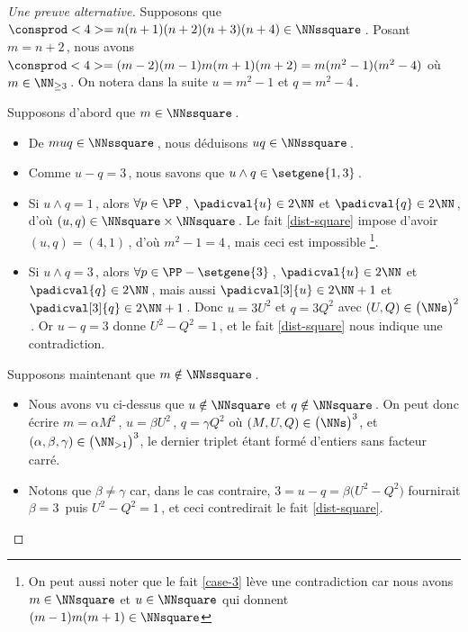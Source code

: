 \begin{proof}[Une preuve alternative]%
	Supposons que $\consprod<4> = n(n+1)(n+2)(n+3)(n+4) \in \NNssquare$\,.
	Posant $m = n+2$\,, nous avons $\consprod<4> = (m-2)(m-1)m(m+1)(m+2) = m(m^2 - 1)(m^2 - 4)$ où $m \in \NN_{\geq 3}$\,.
	On notera dans la suite $u = m^2 - 1$ et $q = m^2 - 4$\,.
	
	\medskip
	
	Supposons d'abord que $m \in \NNssquare$\,.
	\begin{itemize}
		\item De $muq \in \NNssquare$\,, nous déduisons $uq \in \NNssquare$\,.

		\item Comme $u - q = 3$\,, nous savons que $u \wedge q \in \setgene{1, 3}$\,.

		\item Si $u \wedge q = 1$\,, 
		alors $\forall p \in \PP$\,, 
		$\padicval{u} \in 2 \NN$ et $\padicval{q} \in 2 \NN$\,,
		d'où 
		$(u, q) \in \NNsquare \times \NNsquare$\,.
		Le fait \ref{dist-square} impose d'avoir $(u, q) = (4, 1)$\,, d'où $m^2 - 1 = 4$\,, mais ceci est impossible
		\footnote{
			On peut aussi noter que le fait \ref{case-3} lève une contradiction car nous avons $m \in \NNsquare$ et $u \in \NNsquare$ qui donnent $(m-1)m(m+1) \in \NNsquare$
		}.

		\item Si $u \wedge q = 3$\,, 
		alors $\forall p \in \PP - \setgene{3}$\,, 
		$\padicval{u} \in 2 \NN$ et $\padicval{q} \in 2 \NN$\,,
		mais aussi $\padicval[3]{u} \in 2 \NN + 1$ et $\padicval[3]{q} \in 2 \NN + 1$\,.
		Donc 
		$u = 3 U^2$ et $q = 3 Q^2$ avec $(U, Q) \in \big( \NNs \big)^2$\,.
		Or $u - q = 3$ donne $U^2 - Q^2 = 1$\,, et le fait \ref{dist-square} nous indique une contradiction.
	\end{itemize}
	
	\medskip
	
	Supposons maintenant que $m \notin \NNssquare$\,.
	\begin{itemize}
		\item Nous avons vu ci-dessus que $u \notin \NNsquare$ et $q \notin \NNsquare$\,. On peut donc écrire $m = \alpha M^2$\,, $u = \beta U^2$\,, $q = \gamma Q^2$ où $(M, U, Q) \in \big( \NNs \big)^3$, et $(\alpha, \beta, \gamma) \in \big( \NN_{>1} \big)^3$, le dernier triplet étant formé d'entiers sans facteur carré.


		\item Notons que $\beta \neq \gamma$ car, dans le cas contraire, $3 = u - q = \beta \big( U^2 - Q^2 \big)$ fournirait $\beta = 3$\, puis $U^2 - Q^2 = 1$\,, et ceci contredirait le fait \ref{dist-square}.



\end{itemize}
\end{proof}
